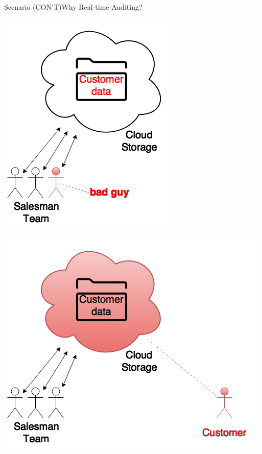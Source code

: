 \documentclass{beamer}
\begin{document}
\begin{CJK}{UTF8}{bkai}
\begin{frame}{Scenario (CON'T)}{Why Real-time Auditing?}
	\begin{minipage}{.49\hsize}
	\begin{center}
	\includegraphics[width=.75\textwidth]{Scenario2.png}
	\end{center}
	\end{minipage}
	\pause
	\begin{minipage}{.49\hsize}
	\begin{center}
	\includegraphics[width=.95\textwidth]{Scenario3.png}
	\end{center}
	\end{minipage}
\end{frame}


\end{CJK}
\end{document}
